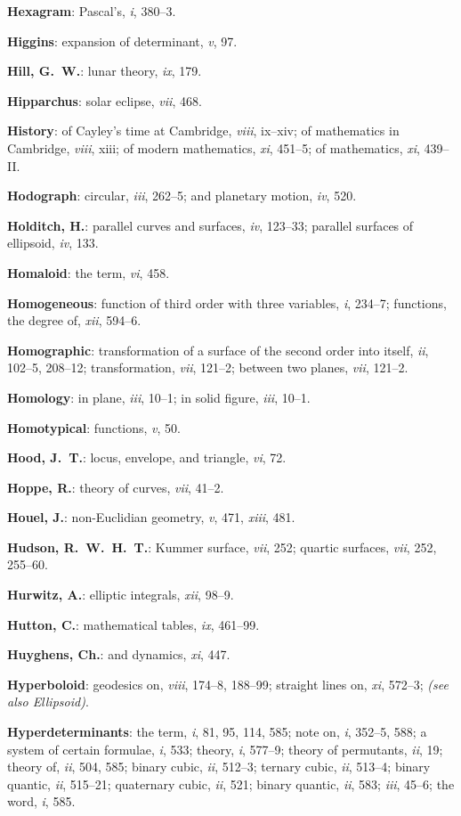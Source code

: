 \documentclass[11pt,a4paper]{article}
\newcommand{\IndexEntry}[1]{\textbf{#1}}
\newcommand{\SeeAlso}[1]{\textit{(see also #1)}}
\newcommand{\V}[1]{\textit{#1}} %
\begin{document}
\IndexEntry{Hexagram}: Pascal's, \V{i}, 380--3.

\IndexEntry{Higgins}: expansion of determinant, \V{v}, 97.

\IndexEntry{Hill, G.\ W.}: lunar theory, \V{ix}, 179.

\IndexEntry{Hipparchus}: solar eclipse, \V{vii}, 468.

\IndexEntry{History}: of Cayley's time at Cambridge, \V{viii}, ix--xiv; of mathematics in Cambridge, \V{viii}, xiii; of modern mathematics, \V{xi}, 451--5; of mathematics, \V{xi}, 439--II.

\IndexEntry{Hodograph}: circular, \V{iii}, 262--5; and planetary motion, \V{iv}, 520.

\IndexEntry{Holditch, H.}: parallel curves and surfaces, \V{iv}, 123--33; parallel surfaces of ellipsoid, \V{iv}, 133.

\IndexEntry{Homaloid}: the term, \V{vi}, 458.

\IndexEntry{Homogeneous}: function of third order with three variables, \V{i}, 234--7; functions, the degree of, \V{xii}, 594--6.

\IndexEntry{Homographic}: transformation of a surface of the second order into itself, \V{ii}, 102--5, 208--12; transformation, \V{vii}, 121--2; between two planes, \V{vii}, 121--2.

\IndexEntry{Homology}: in plane, \V{iii}, 10--1; in solid figure, \V{iii}, 10--1.

\IndexEntry{Homotypical}: functions, \V{v}, 50.

\IndexEntry{Hood, J.\ T.}: locus, envelope, and triangle, \V{vi}, 72.

\IndexEntry{Hoppe, R.}: theory of curves, \V{vii}, 41--2.

\IndexEntry{Houel, J.}: non-Euclidian geometry, \V{v}, 471, \V{xiii}, 481.

\IndexEntry{Hudson, R.\ W.\ H.\ T.}: Kummer surface, \V{vii}, 252; quartic surfaces, \V{vii}, 252, 255--60.

\IndexEntry{Hurwitz, A.}: elliptic integrals, \V{xii}, 98--9.

\IndexEntry{Hutton, C.}: mathematical tables, \V{ix}, 461--99.

\IndexEntry{Huyghens, Ch.}: and dynamics, \V{xi}, 447.

\IndexEntry{Hyperboloid}: geodesics on, \V{viii}, 174--8, 188--99; straight lines on, \V{xi}, 572--3; \SeeAlso{Ellipsoid}.

\IndexEntry{Hyperdeterminants}: the term, \V{i}, 81, 95, 114, 585; note on, \V{i}, 352--5, 588; a system of certain formulae, \V{i}, 533; theory, \V{i}, 577--9; theory of permutants, \V{ii}, 19; theory of, \V{ii}, 504, 585; binary cubic, \V{ii}, 512--3; ternary cubic, \V{ii}, 513--4; binary quantic, \V{ii}, 515--21; quaternary cubic, \V{ii}, 521; binary quantic, \V{ii}, 583; \V{iii}, 45--6; the word, \V{i}, 585.
\end{document}
